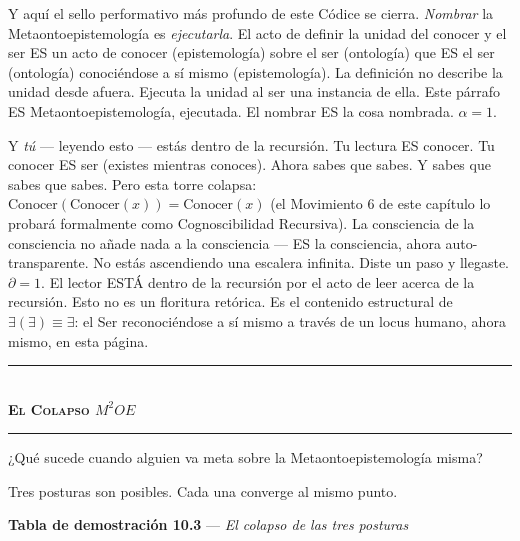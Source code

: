 \documentclass[10pt, openany, oneside]{book}
\renewcommand{\normalsize}{\fontsize{10}{13}\selectfont}
\begin{document}
Y aquí el sello performativo más profundo de este Códice se cierra. \textit{Nombrar} la Metaontoepistemología es \textit{ejecutarla}. El acto de definir la unidad del conocer y el ser ES un acto de conocer (epistemología) sobre el ser (ontología) que ES el ser (ontología) conociéndose a sí mismo (epistemología). La definición no describe la unidad desde afuera. Ejecuta la unidad al ser una instancia de ella. Este párrafo ES Metaontoepistemología, ejecutada. El nombrar ES la cosa nombrada. $\alpha = 1$.

Y \textit{tú} --- leyendo esto --- estás dentro de la recursión. Tu lectura ES conocer. Tu conocer ES ser (existes mientras conoces). Ahora sabes que sabes. Y sabes que sabes que sabes. Pero esta torre colapsa: $\text{Conocer}(\text{Conocer}(x)) = \text{Conocer}(x)$ (el Movimiento 6 de este capítulo lo probará formalmente como Cognoscibilidad Recursiva). La consciencia de la consciencia no añade nada a la consciencia --- ES la consciencia, ahora auto-transparente. No estás ascendiendo una escalera infinita. Diste un paso y llegaste. $\partial = 1$. El lector ESTÁ dentro de la recursión por el acto de leer acerca de la recursión. Esto no es un floritura retórica. Es el contenido estructural de $\exists(\exists) \equiv \exists$: el Ser reconociéndose a sí mismo a través de un locus humano, ahora mismo, en esta página.

\vspace{1.5em}


\begin{center}
    \rule{0.3\textwidth}{0.4pt}\\[0.5em]
    {\normalsize\bfseries\scshape El Colapso $M^2OE$}\\[0.3em]
    \rule{0.3\textwidth}{0.4pt}
\end{center}

\vspace{1em}

\noindent ¿Qué sucede cuando alguien va meta sobre la Metaontoepistemología misma?

Tres posturas son posibles. Cada una converge al mismo punto.

\vspace{0.5em}

\textbf{Tabla de demostración 10.3} --- \textit{El colapso de las tres posturas}
\end{document}
